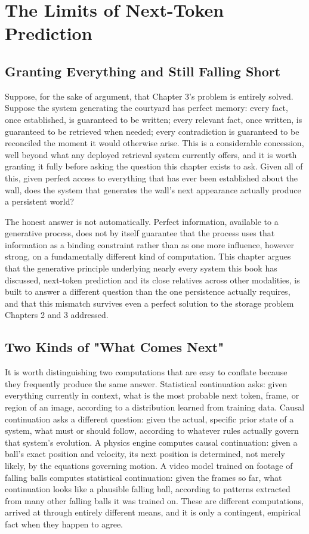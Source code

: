 \chapter{The Limits of Next-Token Prediction}

\section{Granting Everything and Still Falling Short}

Suppose, for the sake of argument, that Chapter 3's problem is entirely solved. Suppose the system generating the courtyard has perfect memory: every fact, once established, is guaranteed to be written; every relevant fact, once written, is guaranteed to be retrieved when needed; every contradiction is guaranteed to be reconciled the moment it would otherwise arise. This is a considerable concession, well beyond what any deployed retrieval system currently offers, and it is worth granting it fully before asking the question this chapter exists to ask. Given all of this, given perfect access to everything that has ever been established about the wall, does the system that generates the wall's next appearance actually produce a persistent world?

The honest answer is not automatically. Perfect information, available to a generative process, does not by itself guarantee that the process uses that information as a binding constraint rather than as one more influence, however strong, on a fundamentally different kind of computation. This chapter argues that the generative principle underlying nearly every system this book has discussed, next-token prediction and its close relatives across other modalities, is built to answer a different question than the one persistence actually requires, and that this mismatch survives even a perfect solution to the storage problem Chapters 2 and 3 addressed.

\section{Two Kinds of "What Comes Next"}

It is worth distinguishing two computations that are easy to conflate because they frequently produce the same answer. Statistical continuation asks: given everything currently in context, what is the most probable next token, frame, or region of an image, according to a distribution learned from training data. Causal continuation asks a different question: given the actual, specific prior state of a system, what must or should follow, according to whatever rules actually govern that system's evolution. A physics engine computes causal continuation: given a ball's exact position and velocity, its next position is determined, not merely likely, by the equations governing motion. A video model trained on footage of falling balls computes statistical continuation: given the frames so far, what continuation looks like a plausible falling ball, according to patterns extracted from many other falling balls it was trained on. These are different computations, arrived at through entirely different means, and it is only a contingent, empirical fact when they happen to agree.

